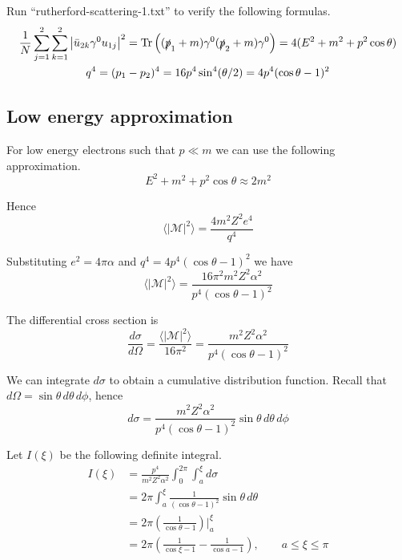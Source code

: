 \documentclass[12pt]{article}
\begin{document}
\noindent
Run ``rutherford-scattering-1.txt'' to verify the following formulas.
\begin{gather*}
\frac{1}{N}\sum_{j=1}^2\sum_{k=1}^2\left|\bar{u}_{2k}\gamma^0 u_{1j}\right|^2
=\mathop{\rm Tr}\left((\slashed{p}_1+m)\gamma^0(\slashed{p}_2+m)\gamma^0\right)
=4(E^2+m^2+p^2\cos\theta)
\\
q^4=(p_1-p_2)^4=16p^4\sin^4(\theta/2)=4p^4(\cos\theta-1)^2
\end{gather*}

\subsection*{Low energy approximation}
For low energy electrons such that $p\ll m$ we can use the following approximation.
\begin{equation*}
E^2+m^2+p^2\cos\theta\approx2m^2
\end{equation*}

\noindent
Hence
\begin{equation*}
\langle|\mathcal{M}|^2\rangle=\frac{4m^2Z^2e^4}{q^4}
\end{equation*}

\noindent
Substituting $e^2=4\pi\alpha$ and $q^4=4p^4(\cos\theta-1)^2$ we have
\begin{equation*}
\langle|\mathcal{M}|^2\rangle=\frac{16\pi^2m^2Z^2\alpha^2}{p^4(\cos\theta-1)^2}
\end{equation*}

\noindent
The differential cross section is
\begin{equation*}
\frac{d\sigma}{d\Omega}=\frac{\langle|\mathcal{M}|^2\rangle}{16\pi^2}
=\frac{m^2Z^2\alpha^2}{p^4(\cos\theta-1)^2}
\end{equation*}

\noindent
We can integrate $d\sigma$ to obtain a cumulative distribution function.
Recall that $d\Omega=\sin\theta\,d\theta\,d\phi$, hence
\begin{equation*}
d\sigma=\frac{m^2Z^2\alpha^2}{p^4(\cos\theta-1)^2}\sin\theta\,d\theta\,d\phi
\end{equation*}

\noindent
Let $I(\xi)$ be the following definite integral.
\begin{align*}
I(\xi)&=\frac{p^4}{m^2Z^2\alpha^2}\int_0^{2\pi}\int_a^\xi d\sigma
\\
&=2\pi\int_a^\xi\frac{1}{(\cos\theta-1)^2}\sin\theta\,d\theta
\\
&=2\pi\left(\frac{1}{\cos\theta-1}\right)\bigg|_a^\xi
\\
&=2\pi\left(\frac{1}{\cos\xi-1}-\frac{1}{\cos a-1}\right),\qquad a\le\xi\le\pi
\end{align*}
\end{document}

